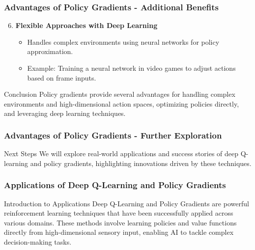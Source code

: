 \documentclass[aspectratio=169]{beamer}
\begin{document}
\begin{frame}[fragile]
    \frametitle{Advantages of Policy Gradients - Additional Benefits}
    \begin{enumerate}
        \setcounter{enumi}{5} %
        \item \textbf{Flexible Approaches with Deep Learning}
            \begin{itemize}
                \item Handles complex environments using neural networks for policy approximation.
                \item Example: Training a neural network in video games to adjust actions based on frame inputs.
            \end{itemize}
    \end{enumerate}

    \begin{block}{Conclusion}
        Policy gradients provide several advantages for handling complex environments and high-dimensional action spaces, optimizing policies directly, and leveraging deep learning techniques.
    \end{block}
\end{frame}

\begin{frame}[fragile]
    \frametitle{Advantages of Policy Gradients - Further Exploration}
    \begin{block}{Next Steps}
        We will explore real-world applications and success stories of deep Q-learning and policy gradients, highlighting innovations driven by these techniques.
    \end{block}
\end{frame}

\begin{frame}[fragile]
    \frametitle{Applications of Deep Q-Learning and Policy Gradients}
    \begin{block}{Introduction to Applications}
        Deep Q-Learning and Policy Gradients are powerful reinforcement learning techniques that have been successfully applied across various domains. These methods involve learning policies and value functions directly from high-dimensional sensory input, enabling AI to tackle complex decision-making tasks.
    \end{block}
\end{frame}
\end{document}
